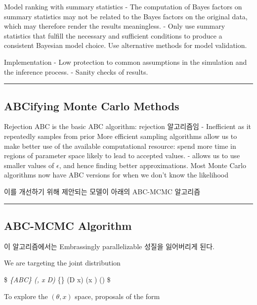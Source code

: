 \documentclass[
]{book}
\begin{document}
Model ranking with summary statistics
- The computation of Bayes factors on summary statistics may not be related to the Bayes factors on the original data, which may therefore render the results meaningless.
- Only use summary statistics that fulfill the necessary and sufficient conditions to produce a consistent Bayesian model choice. Use alternative methods for model validation.

Implementation
- Low protection to common assumptions in the simulation and the inference process.
- Sanity checks of results.

\begin{center}\rule{0.5\linewidth}{0.5pt}\end{center}

\hypertarget{abcifying-monte-carlo-methods}{%
\subsection{ABCifying Monte Carlo Methods}\label{abcifying-monte-carlo-methods}}

Rejection ABC is the basic ABC algorithm: rejection 알고리즘임
- Inefficient as it repeatedly samples from prior More efficient sampling algorithms allow us to make better use of the available computational resource: spend more time in regions of parameter space likely to lead to accepted values.
- allows us to use smaller values of \(\epsilon\), and hence finding better approximations. Most Monte Carlo algorithms now have ABC versions for when we don't know the likelihood

이를 개선하기 위해 제안되는 모델이 아래의 ABC-MCMC 알고리즘

\begin{center}\rule{0.5\linewidth}{0.5pt}\end{center}

\hypertarget{abc-mcmc-algorithm}{%
\subsection{ABC-MCMC Algorithm}\label{abc-mcmc-algorithm}}

이 알고리즘에서는 Embrassingly parallelizable 성질을 잃어버리게 된다.

We are targeting the joint distribution

\$
\pi\emph{\{ABC\} (\theta , x \vert D) \propto \pi}\{\epsilon\} (D \vert x) \pi (x \vert \theta) \pi(\theta)
\$

To explore the \((\theta, x)\) space, proposals of the form
\end{document}

